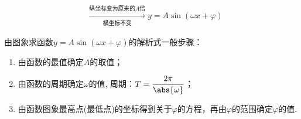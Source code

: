 \begin{description}
\begin{minipage}[h]{0.55\linewidth}
\[\begin{aligned}
            &\xrightarrow[\text{横坐标不变}]{\text{纵坐标变为原来的}A\text{倍}}y=A\sin\left(\omega x+\varphi\right)
          \end{aligned}\]
      \end{minipage}
    \item 由图象求函数$y=A\sin\left(\omega x+\varphi\right)$的解析式一般步骤：
      \begin{enumerate}[label=\arabic*\degree]
        \item 由函数的最值确定$ A $的取值；
        \item 由函数的周期确定$ \omega $的值, 周期：$ T=\dfrac{2\pi}{\abs{\omega}} $；
        \item 由函数图象最高点(最低点)的坐标得到关于$ \varphi $的方程，再由$ \varphi $的范围确定$ \varphi $的值.
      \end{enumerate}
  \end{description}
